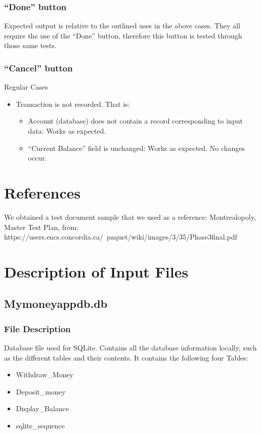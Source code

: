 \documentclass[12pt]{article}
\begin{document}
\subsubsection{``Done'' button}

Expected output is relative to the outlined uses in the above cases. They all require the use of the ``Done'' button, therefore this button is tested through those same tests.
	
\subsubsection{``Cancel'' button}

Regular Cases
\begin{itemize}
  \item Transaction is not recorded. That is:
  \begin{itemize}
    \item Account (database) does not contain a record corresponding to input data: Works as expected.
    \item ``Current Balance'' field is unchanged: Works as expected. No changes occur.
  \end{itemize}
\end{itemize}

\section{References}
We obtained a test document sample that we used as a reference: Montrealopoly, Master Test Plan, from: https://users.encs.concordia.ca/~paquet/wiki/images/3/35/Phase3final.pdf

\appendix

\section{Description of Input Files}

\subsection{Mymoneyappdb.db}

\subsubsection{File Description}
Database file used for SQLite. Contains all the database information locally, such as the different tables and their contents. It contains the following four Tables:
\begin{itemize}
  \item Withdraw\_Money
  \item Deposit\_money
  \item Display\_Balance
  \item sqlite\_sequence
\end{itemize}
\end{document}
